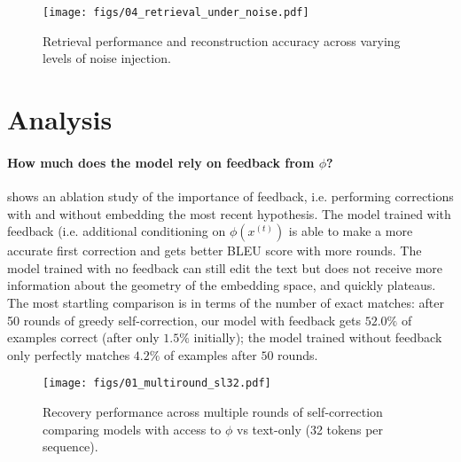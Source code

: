 \documentclass[11pt]{article}
\begin{document}
\begin{figure}[t]
    \centering
    \texttt{[image: figs/04\_retrieval\_under\_noise.pdf]}
    \caption{Retrieval performance and reconstruction accuracy across varying levels of noise injection.}
    \label{fig:04_retrieval_under_noise}
\end{figure}


\section{Analysis}
\label{sec:analysis}



\paragraph{How much does the model rely on feedback from $\phi$?}  shows an ablation study of the importance of feedback, i.e. performing corrections with and without embedding the most recent hypothesis. The model trained with feedback (i.e. additional conditioning on $\phi(x^{(t)})$ is able to make a more accurate first correction and gets better BLEU score with more rounds. The model trained with no feedback can still edit the text but does not receive more information about the geometry of the embedding space, and quickly plateaus. The most startling comparison is in terms of the number of exact matches: after 50 rounds of greedy self-correction, our model with feedback gets $52.0\%$ of examples correct (after only $1.5\%$ initially); the model trained without feedback only perfectly matches $4.2\%$ of examples after $50$ rounds.


\begin{figure}[t]
    \centering
    \texttt{[image: figs/01\_multiround\_sl32.pdf]}
    \caption{
    Recovery performance across multiple rounds of self-correction comparing models with access to $\phi$ vs text-only (32 tokens per sequence).
    }
    \label{fig:01_multiround}
\end{figure}
\end{document}
